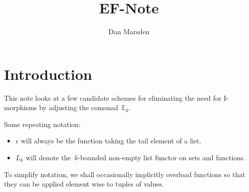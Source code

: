 \documentclass{article}
\title{EF-Note}
\author{Dan Marsden}
\theoremstyle{plain}
\theoremstyle{definition}
\theoremstyle{remark}
\numberwithin{theorem}{section}
\begin{document}
\maketitle

\section{Introduction}
This note looks at a few candidate schemes for eliminating the need for I-morphisms by adjusting the comonad~$\mathbb{E}_k$.

Some repeating notation:
\begin{itemize}
    \item $\epsilon$ will always be the function taking the tail element of a list.
    \item $L_k$ will denote the~$k$-bounded non-empty list functor on sets and functions.
\end{itemize}
To simplify notation, we shall occasionally implicitly overload functions so that they can be applied element wise to tuples of values.
\end{document}
